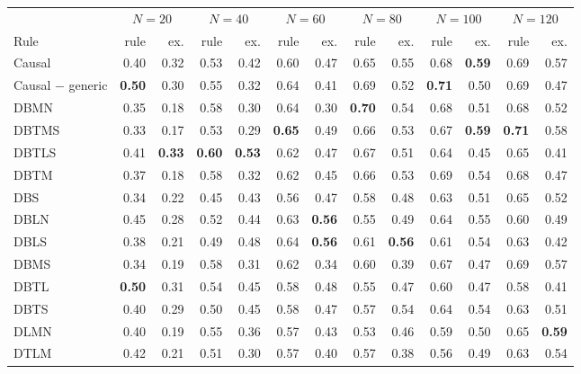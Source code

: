 \begin{tabular}{@{}lrrrrrrrrrrrr@{}}
\toprule
 & \multicolumn{2}{c}{$N=20$} & \multicolumn{2}{c}{$N=40$} & \multicolumn{2}{c}{$N=60$} & \multicolumn{2}{c}{$N=80$} & \multicolumn{2}{c}{$N=100$} & \multicolumn{2}{c}{$N=120$} \\
\cmidrule(lr){2-3}\cmidrule(lr){4-5}\cmidrule(lr){6-7}\cmidrule(lr){8-9}\cmidrule(lr){10-11}\cmidrule(lr){12-13}
Rule & rule & ex. & rule & ex. & rule & ex. & rule & ex. & rule & ex. & rule & ex. \\
\midrule
Causal & 0.40 & 0.32 & 0.53 & 0.42 & 0.60 & 0.47 & 0.65 & 0.55 & 0.68 & \textbf{0.59} & 0.69 & 0.57 \\
Causal $-$ generic & \textbf{0.50} & 0.30 & 0.55 & 0.32 & 0.64 & 0.41 & 0.69 & 0.52 & \textbf{0.71} & 0.50 & 0.69 & 0.47 \\
\midrule
DBMN & 0.35 & 0.18 & 0.58 & 0.30 & 0.64 & 0.30 & \textbf{0.70} & 0.54 & 0.68 & 0.51 & 0.68 & 0.52 \\
DBTMS & 0.33 & 0.17 & 0.53 & 0.29 & \textbf{0.65} & 0.49 & 0.66 & 0.53 & 0.67 & \textbf{0.59} & \textbf{0.71} & 0.58 \\
DBTLS & 0.41 & \textbf{0.33} & \textbf{0.60} & \textbf{0.53} & 0.62 & 0.47 & 0.67 & 0.51 & 0.64 & 0.45 & 0.65 & 0.41 \\
DBTM & 0.37 & 0.18 & 0.58 & 0.32 & 0.62 & 0.45 & 0.66 & 0.53 & 0.69 & 0.54 & 0.68 & 0.47 \\
DBS & 0.34 & 0.22 & 0.45 & 0.43 & 0.56 & 0.47 & 0.58 & 0.48 & 0.63 & 0.51 & 0.65 & 0.52 \\
DBLN & 0.45 & 0.28 & 0.52 & 0.44 & 0.63 & \textbf{0.56} & 0.55 & 0.49 & 0.64 & 0.55 & 0.60 & 0.49 \\
DBLS & 0.38 & 0.21 & 0.49 & 0.48 & 0.64 & \textbf{0.56} & 0.61 & \textbf{0.56} & 0.61 & 0.54 & 0.63 & 0.42 \\
DBMS & 0.34 & 0.19 & 0.58 & 0.31 & 0.62 & 0.34 & 0.60 & 0.39 & 0.67 & 0.47 & 0.69 & 0.57 \\
DBTL & \textbf{0.50} & 0.31 & 0.54 & 0.45 & 0.58 & 0.48 & 0.55 & 0.47 & 0.60 & 0.47 & 0.58 & 0.41 \\
DBTS & 0.40 & 0.29 & 0.50 & 0.45 & 0.58 & 0.47 & 0.57 & 0.54 & 0.64 & 0.54 & 0.63 & 0.51 \\
DLMN & 0.40 & 0.19 & 0.55 & 0.36 & 0.57 & 0.43 & 0.53 & 0.46 & 0.59 & 0.50 & 0.65 & \textbf{0.59} \\
DTLM & 0.42 & 0.21 & 0.51 & 0.30 & 0.57 & 0.40 & 0.57 & 0.38 & 0.56 & 0.49 & 0.63 & 0.54 \\

\end{tabular}

